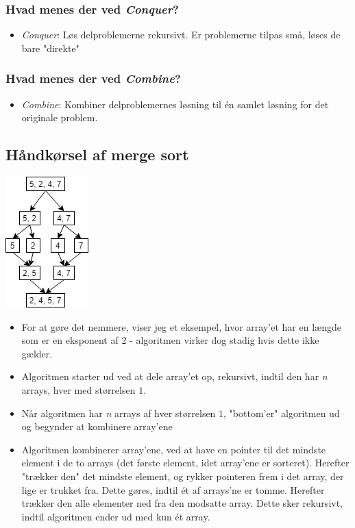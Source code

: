 \documentclass{article}
\begin{document}
\subsubsection*{Hvad menes der ved \textit{Conquer}?}
\begin{itemize}
    \item \textit{Conquer}: Løs delproblemerne rekursivt. Er problemerne tilpas små, løses de bare "direkte"
\end{itemize}
\subsubsection*{Hvad menes der ved \textit{Combine}?}
\begin{itemize}
    \item \textit{Combine}: Kombiner delproblemernes løsning til én samlet løsning for det originale problem.
\end{itemize}
\subsection*{Håndkørsel af merge sort}
\begin{center}
    \includegraphics[height = 5 cm]{../entities/merge_sort_example.png}
\end{center}
\begin{itemize}
    \item For at gøre det nemmere, viser jeg et eksempel, hvor array'et har en længde som er en eksponent af 2 - algoritmen virker dog stadig hvis dette ikke gælder.
    \item Algoritmen starter ud ved at dele array'et op, rekursivt, indtil den har \textit{n} arrays, hver med størrelsen $1$.
    \item Når algoritmen har \textit{n} arrays af hver størrelsen $1$, "bottom'er" algoritmen ud og begynder at kombinere array'ene
    \item Algoritmen kombinerer array'ene, ved at have en pointer til det mindste element i de to arrays (det første element, idet array'ene er sorteret). Herefter "trækker den" det mindste element, og rykker pointeren frem i det array, der lige er trukket fra. Dette gøres, indtil ét af arrays'ne er tomme. Herefter trækker den alle elementer ned fra den modsatte array. Dette sker rekursivt, indtil algoritmen ender ud med kun ét array.
\end{itemize}
\end{document}
